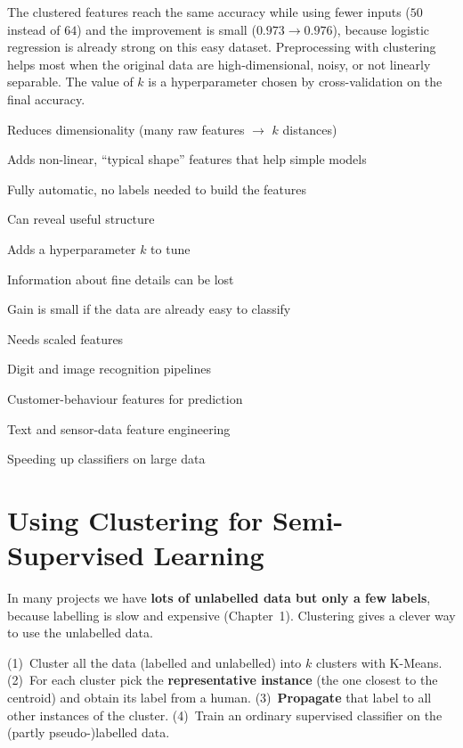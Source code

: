 \noindent The clustered features reach the same accuracy while using fewer inputs ($50$ instead of $64$) and the improvement is small ($0.973\to0.976$), because logistic regression is already strong on this easy dataset. Preprocessing with clustering helps most when the original data are high-dimensional, noisy, or not linearly separable. The value of $k$ is a hyperparameter chosen by cross-validation on the final accuracy.

{\item Reduces dimensionality (many raw features $\to$ $k$ distances)
 \item Adds non-linear, ``typical shape'' features that help simple models
 \item Fully automatic, no labels needed to build the features
 \item Can reveal useful structure}
{\item Adds a hyperparameter $k$ to tune
 \item Information about fine details can be lost
 \item Gain is small if the data are already easy to classify
 \item Needs scaled features}
{\item Digit and image recognition pipelines
 \item Customer-behaviour features for prediction
 \item Text and sensor-data feature engineering
 \item Speeding up classifiers on large data}

\section{Using Clustering for Semi-Supervised Learning}\label{sec:semi}

In many projects we have \textbf{lots of unlabelled data but only a few labels}, because labelling is slow and expensive (Chapter~1). Clustering gives a clever way to use the unlabelled data.

\begin{definition}
(1)~Cluster all the data (labelled and unlabelled) into $k$ clusters with K-Means. (2)~For each cluster pick the \textbf{representative instance} (the one closest to the centroid) and obtain its label from a human. (3)~\textbf{Propagate} that label to all other instances of the cluster. (4)~Train an ordinary supervised classifier on the (partly pseudo-)labelled data.
\end{definition}

